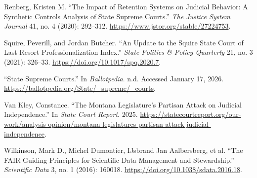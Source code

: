 \begin{CSLReferences}{1}{1}
Renberg, Kristen M. {``The {Impact} of {Retention Systems} on {Judicial
Behavior}: A {Synthetic Controls Analysis} of {State Supreme Courts}.''}
\emph{The Justice System Journal} 41, no. 4 (2020): 292--312.
\url{https://www.jstor.org/stable/27224753}.

Squire, Peverill, and Jordan Butcher. {``An {Update} to the {Squire
State Court} of {Last Resort Professionalization Index}.''} \emph{State
Politics \& Policy Quarterly} 21, no. 3 (2021): 326--33.
\url{https://doi.org/10.1017/spq.2020.7}.

{``State Supreme Courts.''} In \emph{Ballotpedia}. n.d. Accessed January
17, 2026. \url{https://ballotpedia.org/State/_supreme/_courts}.

Van Kley, Constance. {``The {Montana Legislature}'s {Partisan Attack} on
{Judicial Independence}.''} In \emph{State Court Report}. 2025.
\url{https://statecourtreport.org/our-work/analysis-opinion/montana-legislatures-partisan-attack-judicial-independence}.

{Wilkinson, Mark D., Michel Dumontier, IJsbrand Jan Aalbersberg, et al.}
{``The {FAIR Guiding Principles} for Scientific Data Management and
Stewardship.''} \emph{Scientific Data} 3, no. 1 (2016): 160018.
\url{https://doi.org/10.1038/sdata.2016.18}.

\end{CSLReferences}

